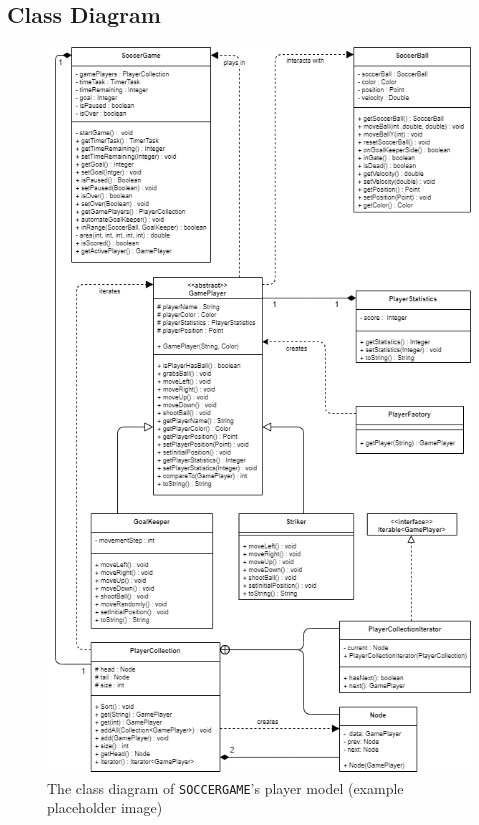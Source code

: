 \documentclass[12pt, dvipsnames, a4paper]{article}
\newcommand{\code}[1]{\texttt{#1}}
\begin{document}
\subsection{Class Diagram}
\begin{center}
	\begin{figure}[H]
		\hspace{50pt}
		\includegraphics[scale=.65]{diagrams/class-diagrams/soccer-model/soccer-model-cd.png}
		\caption{The class diagram of \code{SOCCERGAME}'s player model (example placeholder image)}
		\label{fig:backend}
	\end{figure}
\end{center}
\clearpage
\end{document}
